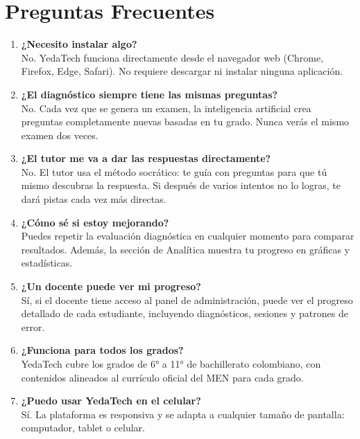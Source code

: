 \documentclass[12pt, a4paper]{article}
\begin{document}
\section{Preguntas Frecuentes}

\begin{enumerate}[leftmargin=*, itemsep=10pt, font=\bfseries\color{ytOrange}]
    \item \textbf{¿Necesito instalar algo?}\\
    \textcolor{ytGrey}{No. YedaTech funciona directamente desde el navegador web (Chrome, Firefox, Edge, Safari). No requiere descargar ni instalar ninguna aplicación.}
    
    \item \textbf{¿El diagnóstico siempre tiene las mismas preguntas?}\\
    \textcolor{ytGrey}{No. Cada vez que se genera un examen, la inteligencia artificial crea preguntas completamente nuevas basadas en tu grado. Nunca verás el mismo examen dos veces.}
    
    \item \textbf{¿El tutor me va a dar las respuestas directamente?}\\
    \textcolor{ytGrey}{No. El tutor usa el método socrático: te guía con preguntas para que tú mismo descubras la respuesta. Si después de varios intentos no lo logras, te dará pistas cada vez más directas.}
    
    \item \textbf{¿Cómo sé si estoy mejorando?}\\
    \textcolor{ytGrey}{Puedes repetir la evaluación diagnóstica en cualquier momento para comparar resultados. Además, la sección de Analítica muestra tu progreso en gráficas y estadísticas.}
    
    \item \textbf{¿Un docente puede ver mi progreso?}\\
    \textcolor{ytGrey}{Sí, si el docente tiene acceso al panel de administración, puede ver el progreso detallado de cada estudiante, incluyendo diagnósticos, sesiones y patrones de error.}
    
    \item \textbf{¿Funciona para todos los grados?}\\
    \textcolor{ytGrey}{YedaTech cubre los grados de 6° a 11° de bachillerato colombiano, con contenidos alineados al currículo oficial del MEN para cada grado.}
    
    \item \textbf{¿Puedo usar YedaTech en el celular?}\\
    \textcolor{ytGrey}{Sí. La plataforma es responsiva y se adapta a cualquier tamaño de pantalla: computador, tablet o celular.}
\end{enumerate}
\end{document}

